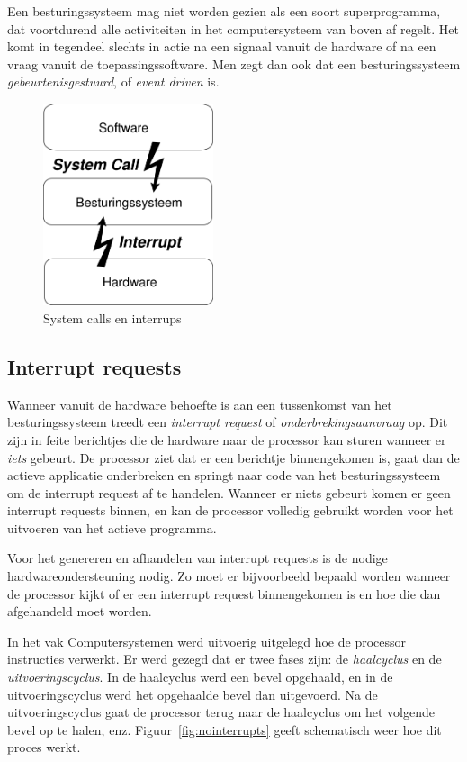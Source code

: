 Een besturingssysteem mag niet worden gezien als een soort
superprogramma, dat voortdurend alle activiteiten in het computersysteem
van boven af regelt. Het komt in tegendeel slechts in actie na een
signaal vanuit de hardware of na een vraag vanuit de toepassingssoftware. 
Men zegt dan ook dat een besturingssysteem \emph{gebeurtenisgestuurd}, 
of \emph{event driven} is.

\begin{figure}
\begin{center}
\includegraphics[width=50mm]{images/fig0201.png}
\end{center}
\caption{System calls en interrups}
\label{sysint}
\end{figure}

\subsection{Interrupt requests}

Wanneer vanuit de hardware behoefte is aan een tussenkomst van
het besturingssysteem treedt een \emph{interrupt request} of
\emph{onderbrekingsaanvraag} op. Dit zijn in feite berichtjes die de hardware naar de processor kan sturen wanneer er \emph{iets} gebeurt. De processor ziet dat er een berichtje binnengekomen is, gaat dan de actieve applicatie onderbreken en springt naar code van het besturingssysteem om de interrupt request af te handelen. Wanneer er niets gebeurt komen er geen interrupt requests binnen, en kan de processor volledig gebruikt worden voor het uitvoeren van het actieve programma.

Voor het genereren en afhandelen van interrupt requests is de nodige hardwareondersteuning nodig. Zo moet er bijvoorbeeld bepaald worden wanneer de processor kijkt of er een interrupt request binnengekomen is en hoe die dan afgehandeld moet worden.

In het vak Computersystemen werd uitvoerig uitgelegd hoe de processor instructies verwerkt. Er werd gezegd dat er twee fases zijn: de \emph{haalcyclus} en de \emph{uitvoeringscyclus}. In de haalcyclus werd een bevel opgehaald, en in de uitvoeringscyclus werd het opgehaalde bevel dan uitgevoerd. Na de uitvoeringscyclus gaat de processor terug naar de haalcyclus om het volgende bevel op te halen, enz. Figuur~\ref{fig:nointerrupts} geeft schematisch weer hoe dit proces werkt.

